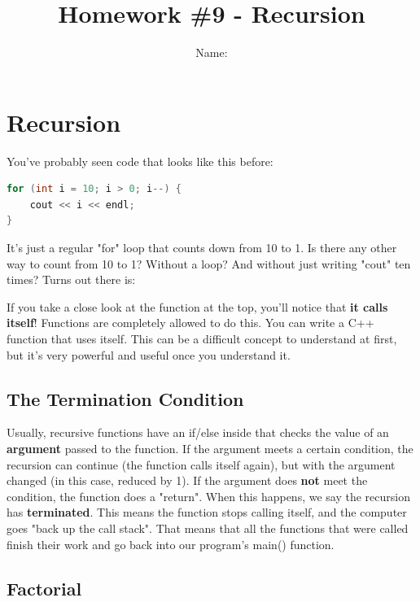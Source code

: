 \documentclass[a4paper,12pt]{article} %
\title{\textbf{Homework \#9 - Recursion}}
\author{Name: }
\date{} %
\begin{document}
\maketitle %

\section{Recursion}

You've probably seen code that looks like this before:

\vspace{5mm}
\begin{lstlisting}[language=C++]
for (int i = 10; i > 0; i--) {
	cout << i << endl;
}
\end{lstlisting}

\noindent
It's just a regular "for" loop that counts down from 10 to 1. Is there any other way to count from 10 to 1? Without a loop? And without just writing "cout" ten times? Turns out there is:

\vspace{5mm}


\noindent
If you take a close look at the function at the top, you'll notice that \textbf{it calls itself}! Functions are completely allowed to do this. You can write a C++ function that uses itself. This can be a difficult concept to understand at first, but it's very powerful and useful once you understand it.

\subsection{The Termination Condition}

Usually, recursive functions have an if/else inside that checks the value of an \textbf{argument} passed to the function. If the argument meets a certain condition, the recursion can continue (the function calls itself again), but with the argument changed (in this case, reduced by 1). If the argument does \textbf{not} meet the condition, the function does a "return". When this happens, we say the recursion has \textbf{terminated}. This means the function stops calling itself, and the computer goes "back up the call stack". That means that all the functions that were called finish their work and go back into our program's main() function. 

\subsection{Factorial}
\end{document}
